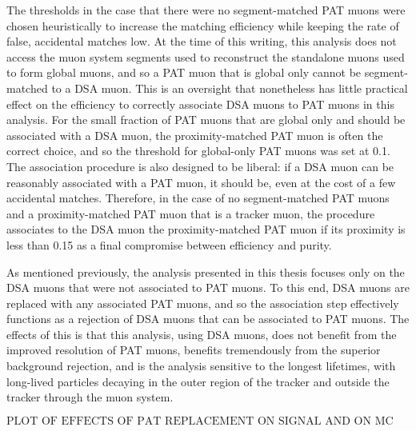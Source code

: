 The \deltaR thresholds in the case that there were no segment-matched PAT muons were chosen heuristically to increase the matching efficiency while keeping the rate of false, accidental matches low.
At the time of this writing, this analysis does not access the muon system segments used to reconstruct the standalone muons used to form global muons, and so a PAT muon that is global only cannot be segment-matched to a DSA muon.
This is an oversight that nonetheless has little practical effect on the efficiency to correctly associate DSA muons to PAT muons in this analysis.
For the small fraction of PAT muons that are global only and should be associated with a DSA muon, the proximity-matched PAT muon is often the correct choice, and so the \deltaR threshold for global-only PAT muons was set at 0.1.
The association procedure is also designed to be liberal: if a DSA muon can be reasonably associated with a PAT muon, it should be, even at the cost of a few accidental matches.
Therefore, in the case of no segment-matched PAT muons and a proximity-matched PAT muon that is a tracker muon, the procedure associates to the DSA muon the proximity-matched PAT muon if its proximity \deltaR is less than 0.15 as a final compromise between efficiency and purity.

As mentioned previously, the analysis presented in this thesis focuses only on the DSA muons that were not associated to PAT muons.
To this end, DSA muons are replaced with any associated PAT muons, and so the association step effectively functions as a rejection of DSA muons that can be associated to PAT muons.
The effects of this is that this analysis, using DSA muons, does not benefit from the improved resolution of PAT muons, benefits tremendously from the superior background rejection, and is the analysis sensitive to the longest lifetimes, with long-lived particles decaying in the outer region of the tracker and outside the tracker through the muon system.

$$\text{PLOT OF EFFECTS OF PAT REPLACEMENT ON SIGNAL AND ON MC BACKGROUND}$$


